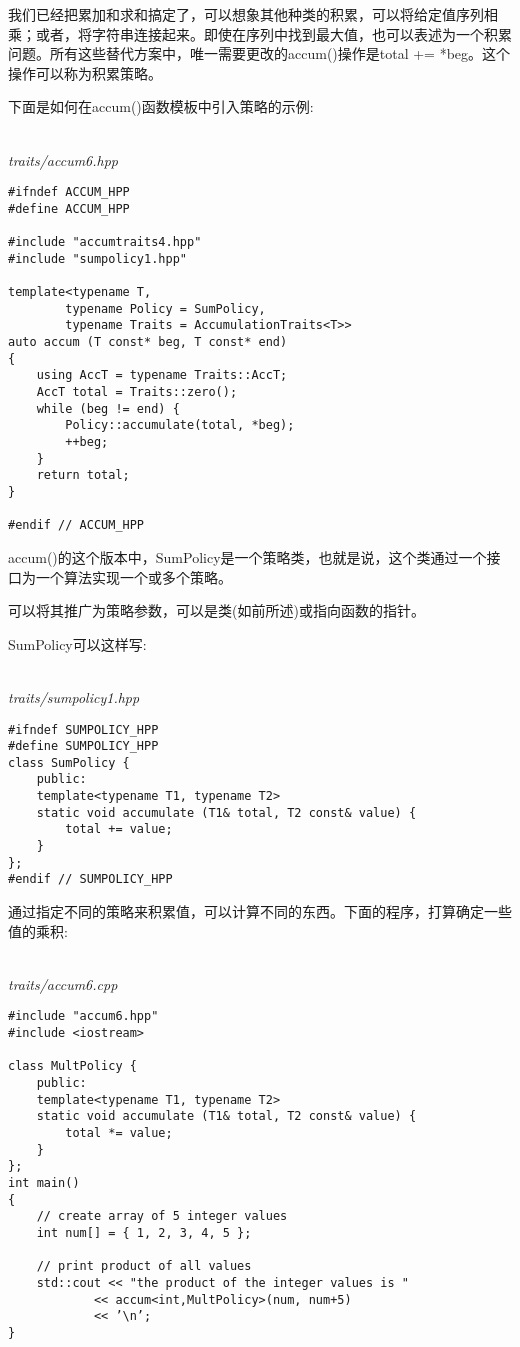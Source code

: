 
我们已经把累加和求和搞定了，可以想象其他种类的积累，可以将给定值序列相乘；或者，将字符串连接起来。即使在序列中找到最大值，也可以表述为一个积累问题。所有这些替代方案中，唯一需要更改的accum()操作是total += *beg。这个操作可以称为积累策略。

下面是如何在accum()函数模板中引入策略的示例:

\hspace*{\fill} \\ %
\noindent
\textit{traits/accum6.hpp}
\begin{lstlisting}[style=styleCXX]
#ifndef ACCUM_HPP
#define ACCUM_HPP

#include "accumtraits4.hpp"
#include "sumpolicy1.hpp"

template<typename T,
		typename Policy = SumPolicy,
		typename Traits = AccumulationTraits<T>>
auto accum (T const* beg, T const* end)
{
	using AccT = typename Traits::AccT;
	AccT total = Traits::zero();
	while (beg != end) {
		Policy::accumulate(total, *beg);
		++beg;
	}
	return total;
}

#endif // ACCUM_HPP
\end{lstlisting}

accum()的这个版本中，SumPolicy是一个策略类，也就是说，这个类通过一个接口为一个算法实现一个或多个策略。

\begin{tcolorbox}[colback=webgreen!5!white,colframe=webgreen!75!black]
\hspace*{0.75cm}可以将其推广为策略参数，可以是类(如前所述)或指向函数的指针。
\end{tcolorbox}

SumPolicy可以这样写:

\hspace*{\fill} \\ %
\noindent
\textit{traits/sumpolicy1.hpp}
\begin{lstlisting}[style=styleCXX]
#ifndef SUMPOLICY_HPP
#define SUMPOLICY_HPP
class SumPolicy {
	public:
	template<typename T1, typename T2>
	static void accumulate (T1& total, T2 const& value) {
		total += value;
	}
};
#endif // SUMPOLICY_HPP
\end{lstlisting}

通过指定不同的策略来积累值，可以计算不同的东西。下面的程序，打算确定一些值的乘积:

\hspace*{\fill} \\ %
\noindent
\textit{traits/accum6.cpp}
\begin{lstlisting}[style=styleCXX]
#include "accum6.hpp"
#include <iostream>

class MultPolicy {
	public:
	template<typename T1, typename T2>
	static void accumulate (T1& total, T2 const& value) {
		total *= value;
	}
};
int main()
{
	// create array of 5 integer values
	int num[] = { 1, 2, 3, 4, 5 };
	
	// print product of all values
	std::cout << "the product of the integer values is "
			<< accum<int,MultPolicy>(num, num+5)
			<< ’\n’;
}
\end{lstlisting}

